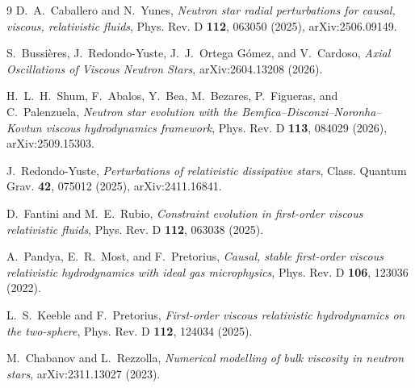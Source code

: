 \documentclass[11pt]{article}
\begin{document}
\begin{thebibliography}{9}
 D.~A.~Caballero and N.~Yunes,
\emph{Neutron star radial perturbations for causal, viscous, relativistic fluids},
Phys. Rev. D \textbf{112}, 063050 (2025), arXiv:2506.09149.

 S.~Bussi\`eres, J.~Redondo-Yuste, J.~J.~Ortega G\'omez, and
V.~Cardoso, \emph{Axial Oscillations of Viscous Neutron Stars}, arXiv:2604.13208
(2026).

 H.~L.~H.~Shum, F.~Abalos, Y.~Bea, M.~Bezares, P.~Figueras, and
C.~Palenzuela, \emph{Neutron star evolution with the
Bemfica--Disconzi--Noronha--Kovtun viscous hydrodynamics framework}, Phys. Rev. D
\textbf{113}, 084029 (2026), arXiv:2509.15303.

 J.~Redondo-Yuste, \emph{Perturbations of relativistic
dissipative stars}, Class. Quantum Grav. \textbf{42}, 075012 (2025),
arXiv:2411.16841.

 D.~Fantini and M.~E.~Rubio, \emph{Constraint evolution in
first-order viscous relativistic fluids}, Phys. Rev. D \textbf{112}, 063038 (2025).

 A.~Pandya, E.~R.~Most, and F.~Pretorius,
\emph{Causal, stable first-order viscous relativistic hydrodynamics with ideal gas
microphysics}, Phys. Rev. D \textbf{106}, 123036 (2022).

 L.~S.~Keeble and F.~Pretorius, \emph{First-order
viscous relativistic hydrodynamics on the two-sphere}, Phys. Rev. D \textbf{112},
124034 (2025).

 M.~Chabanov and L.~Rezzolla, \emph{Numerical
modelling of bulk viscosity in neutron stars}, arXiv:2311.13027 (2023).
\end{thebibliography}
\end{document}
